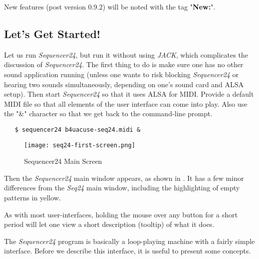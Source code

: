 \documentclass[
 11pt,
 twoside,
 a4paper,
 headinclude,
 footinclude,
 final                                 %
]{article}
\begin{document}
   New features (post version 0.9.2) will be noted with the tag
   "\textbf{New:}".

\subsection{Let's Get Started!}
\label{subsec:introduction_lets_get_started}

   Let us run \textsl{Sequencer24}, but run it without using \textsl{JACK},
   which complicates the discussion of \textsl{Sequencer24}.  The first
   thing to do is make sure one has no other sound application running
   (unless one wants to risk blocking \textsl{Sequencer24} or hearing two
    sounds simultaneously, depending on one's sound card and ALSA setup).
   Then start \textsl{Sequencer24} so that it uses ALSA for MIDI.  Provide a
   default MIDI file so that all elements of the user interface can come
   into play.  Also use the "\&" character so that we get back to the
   command-line prompt.


\begin{verbatim}
   $ sequencer24 b4uacuse-seq24.midi &
\end{verbatim}

\begin{figure}[H]
   \centering 
   \texttt{[image: seq24-first-screen.png]}
   \caption{Sequencer24 Main Screen}
   \label{fig:seq24_main_screen}
\end{figure}

   Then the \textsl{Sequencer24} main window appears, as shown in
   .  It has a few minor differences
   from the \textsl{Seq24} main window, including the highlighting of
   empty patterns in yellow.

   As with most user-interfaces, holding the mouse over any button for a
   short period will let one view a short description (tooltip)
   of what it does.

   The \textsl{Sequencer24} program is basically a loop-playing machine with a 
   fairly simple interface.  Before we describe this interface, it is useful
   to present some concepts.




\end{document}
